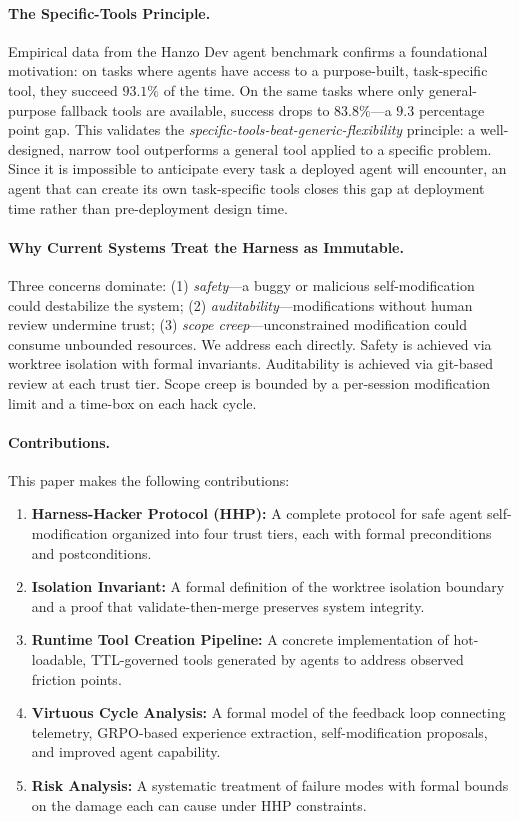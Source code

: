 \documentclass[11pt]{article}
\begin{document}
\paragraph{The Specific-Tools Principle.}
Empirical data from the Hanzo Dev agent benchmark confirms a foundational
motivation: on tasks where agents have access to a purpose-built, task-specific
tool, they succeed $93.1\%$ of the time. On the same tasks where only
general-purpose fallback tools are available, success drops to $83.8\%$---a
$9.3$ percentage point gap. This validates the \emph{specific-tools-beat-generic-flexibility}
principle: a well-designed, narrow tool outperforms a general tool applied to a
specific problem. Since it is impossible to anticipate every task a deployed
agent will encounter, an agent that can create its own task-specific tools
closes this gap at deployment time rather than pre-deployment design time.

\paragraph{Why Current Systems Treat the Harness as Immutable.}
Three concerns dominate: (1) \emph{safety}---a buggy or malicious self-modification
could destabilize the system; (2) \emph{auditability}---modifications without
human review undermine trust; (3) \emph{scope creep}---unconstrained modification
could consume unbounded resources. We address each directly. Safety is achieved
via worktree isolation with formal invariants. Auditability is achieved via
git-based review at each trust tier. Scope creep is bounded by a
per-session modification limit and a time-box on each hack cycle.

\paragraph{Contributions.}
This paper makes the following contributions:

\begin{enumerate}[leftmargin=1.5em]
    \item \textbf{Harness-Hacker Protocol (HHP):} A complete protocol for
          safe agent self-modification organized into four trust tiers, each with
          formal preconditions and postconditions.
    \item \textbf{Isolation Invariant:} A formal definition of the worktree
          isolation boundary and a proof that validate-then-merge preserves
          system integrity.
    \item \textbf{Runtime Tool Creation Pipeline:} A concrete implementation
          of hot-loadable, TTL-governed tools generated by agents to address
          observed friction points.
    \item \textbf{Virtuous Cycle Analysis:} A formal model of the feedback
          loop connecting telemetry, GRPO-based experience extraction,
          self-modification proposals, and improved agent capability.
    \item \textbf{Risk Analysis:} A systematic treatment of failure modes with
          formal bounds on the damage each can cause under HHP constraints.
\end{enumerate}
\end{document}

